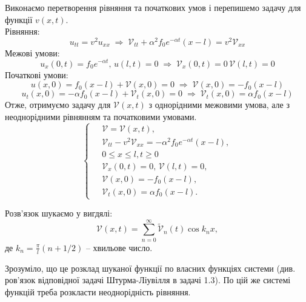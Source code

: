 Виконаємо перетворення рівняння та початкових умов і перепишемо задачу для функції $v(x,t)$.\\
Рівняння:
\begin{equation*}
    u_{tt} = v^2 u_{xx}
    \;\Rightarrow\;
    \mathcal{V}_{tt} + \alpha^2 f_0 e^{-\alpha t} (x-l) = v^2\mathcal{V}_{xx} 
\end{equation*}
Межові умови:
\begin{equation*}
    u_x(0,t) = f_0 e^{-\alpha t}, \, u(l,t) = 0
    \;\Rightarrow\; 
    \mathcal{V}_x(0,t) = 0 \, \mathcal{V}(l,t) = 0
\end{equation*}
Початкові умови:
\begin{equation*}
    u(x,0) = f_0 (x-l) + \mathcal{V}(x,0) = 0
    \;\Rightarrow\;
    \mathcal{V}(x,0) = - f_0 (x-l)
\end{equation*}
\begin{equation*}
    u_t(x,0) = -\alpha f_0 (x-l) + \mathcal{V}_t(x,0) = 0
    \;\Rightarrow\;
    \mathcal{V}_t(x,0) = \alpha f_0  (x-l)
\end{equation*}
Отже, отримуємо задачу для $\mathcal{V}(x,t)$ з однорідними межовими умова, але з неоднорідними рівнянням та початковими умовами.
\begin{equation} \label{new-var-cond}
    \left\{ \begin{aligned} %
            \;&\mathcal{V} = \mathcal{V}(x,t), \\
            &\mathcal{V}_{tt} - v^2 \mathcal{V}_{xx} = -\alpha^2 f_0 e^{-\alpha t} (x-l), \\
            &0 \leq x \leq l, t \geq 0 \\
            &\mathcal{V}_x(0,t) = 0, \, \mathcal{V}(l,t) = 0, \\
            &\mathcal{V}(x,0) = - f_0 (x-l),\\
            &\mathcal{V}_t(x,0) = \alpha f_0 (x-l).
    \end{aligned} \right.
\end{equation}

Розв'язок шукаємо у вигдялі:
\begin{equation}
    \mathcal{V}(x,t) = \sum_{n=0}^\infty \widetilde{\mathcal{V}}_n(t) \cos k_n x,
\end{equation}
де $k_n = \frac{\pi}{l}(n + 1/2)$ -- хвильове число.

Зрозуміло, що це розклад шуканої функції по власних функціях системи (див. ров'язок відповідної задачі Штурма-Ліувілля в задачі 1.3). По цій же системі функцій треба розкласти неоднорідність рівняння.

